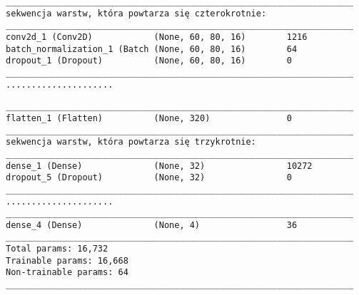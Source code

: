 {\newsavebox\myvq
\begin{lrbox}{\myvq}
\setlength{\myminipagewidth}{0.9\linewidth} %
\setlength{\myminipagecentering}{(\linewidth-\myminipagewidth)/2}
\noindent\hspace{\myminipagecentering}\begin{minipage}{\myminipagewidth}
\begin{verbatim}
____________________________________________________________________
sekwencja warstw, która powtarza się czterokrotnie:
____________________________________________________________________
conv2d_1 (Conv2D)            (None, 60, 80, 16)        1216      
batch_normalization_1 (Batch (None, 60, 80, 16)        64        
dropout_1 (Dropout)          (None, 60, 80, 16)        0    
____________________________________________________________________
.....................
\end{verbatim} 
\end{minipage}\end{lrbox}
\resizebox{0.75\textwidth}{!}{\usebox\myvq}

\newsavebox\myvqq
\begin{lrbox}{\myvqq}
\setlength{\myminipagewidth}{0.9\linewidth} %
\setlength{\myminipagecentering}{(\linewidth-\myminipagewidth)/2}
\noindent\hspace{\myminipagecentering}\begin{minipage}{\myminipagewidth}
\begin{verbatim}
____________________________________________________________________
flatten_1 (Flatten)          (None, 320)               0         
____________________________________________________________________
sekwencja warstw, która powtarza się trzykrotnie:
____________________________________________________________________
dense_1 (Dense)              (None, 32)                10272     
dropout_5 (Dropout)          (None, 32)                0         
____________________________________________________________________
.....................
____________________________________________________________________
dense_4 (Dense)              (None, 4)                 36        
____________________________________________________________________
Total params: 16,732
Trainable params: 16,668
Non-trainable params: 64
____________________________________________________________________
\end{verbatim} 
\end{minipage}\end{lrbox}
\resizebox{0.75\textwidth}{!}{\usebox\myvqq}

}
